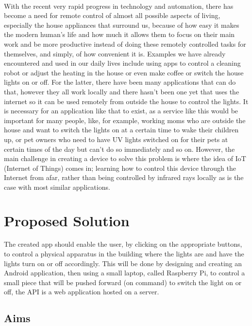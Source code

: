 \documentclass[12pt, oneside, a4paper]{book}
\begin{document}
		\paragraph{}With the recent very rapid progress in technology and automation, there has become a need for remote control of almost all possible aspects of living, especially the house appliances that surround us, because of how easy it makes the modern human’s life and how much it allows them to focus on their main work and be more productive instead of doing these remotely controlled tasks for themselves, and simply, of how convenient it is. Examples we have already encountered and used in our daily lives include using apps to control a cleaning robot or adjust the heating in the house or even make coffee or switch the house lights on or off. For the latter, there have been many applications that can do that, however they all work locally and there hasn’t been one yet that uses the internet so it can be used remotely from outside the house to control the lights. It is necessary for an application like that to exist, as a service like this would be important for many people, like, for example, working moms who are outside the house and want to switch the lights on at a certain time to wake their children up, or pet owners who need to have UV lights switched on for their pets at certain times of the day but can’t do so immediately and so on. However, the main challenge in creating a device to solve this problem is where the idea of IoT (Internet of Things) comes in; learning how to control this device through the Internet from afar, rather than being controlled by infrared rays locally as is the case with most similar applications.
		\section{Proposed Solution}
		\paragraph{}The created app should enable the user, by clicking on the appropriate buttons, to control a physical apparatus in the building where the lights are and have the lights turn on or off accordingly. This will be done by designing and creating an Android application, then using a small laptop, called Raspberry Pi, to control a small piece that will be pushed forward (on command) to switch the light on or off, the API is a web application hosted on a server.
		
		\subsection{Aims}
\end{document}

